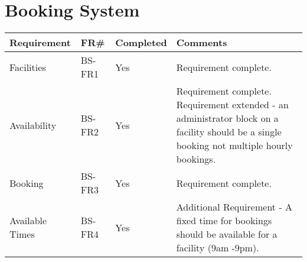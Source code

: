 \section{Booking System}
\begin{tabular}{ |p{5cm}|l|l|p{8cm}|}
\hline
\textbf{Requirement}	&	\textbf{FR\#}	&	\textbf{Completed}	&	\textbf{Comments} \\
\hline
Facilities      									& BS-FR1	& Yes      		& Requirement complete. \\
\hline
Availability   										& BS-FR2	& Yes      		& Requirement complete. Requirement extended - an administrator block on a facility should be a single booking not multiple hourly bookings. 	\\
\hline
Booking         									& BS-FR3	& Yes      		& Requirement complete. \\
\hline
Available Times 									& BS-FR4	& Yes      		& Additional Requirement - A fixed time for bookings should be available for a facility (9am -9pm). \\

\hline
\end{tabular}

